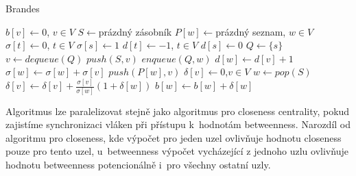 \documentclass{bakalarka}
\begin{document}
\begin{center}
\begin{minipage}{\textwidth}
\begin{algorithm}[H]
	\caption{Brandes}
		\label{alg:brandes}

	\begin{algorithmic}[1]
	\Statex
	\State $b[v] \gets 0$, $v \in V$
		\State $S \gets $prázdný zásobník
		\State $P[w] \gets $prázdný seznam, $w \in V$
		\State $\sigma[t] \gets 0$, $t \in V$
		\State $\sigma[s] \gets 1$
		\State $d[t] \gets -1$, $t \in V$
		\State $d[s] \gets 0$
		\State $Q \gets \{s\}$
			\State $v \gets dequeue(Q)$
			\State $push(S, v)$
					\State $enqueue(Q, w)$
					\State $d[w] \gets d[v] + 1$
				\EndIf
					\State $\sigma[w] \gets \sigma[w] + \sigma[v]$
					\State $push(P[w], v)$
				\EndIf
			\EndFor
		\EndWhile
		\State $\delta[v] \gets 0$,$v \in V$
		 
			\State $w \gets pop(S)$
				\State $\delta[v] \gets \delta[v] + \frac{\sigma[v]}{\sigma[w]}(1 + \delta[w])$
			\EndFor
				\State $b[w] \gets b[w] + \delta[w]$
			\EndIf
		\EndWhile
	\EndFor
	\end{algorithmic}
\end{algorithm}
\end{minipage}
\end{center}
\mbox{}



Algoritmus lze paralelizovat stejně jako algoritmus pro closeness centrality,
pokud zajistíme synchronizaci vláken při přístupu k~hodnotám betweenness.
Narozdíl od algoritmu pro closeness, kde výpočet pro jeden uzel ovlivňuje
hodnotu closeness pouze pro tento uzel, u~betweenness výpočet vycházející z
jednoho uzlu ovlivňuje hodnotu betweenness potencionálně i~pro všechny ostatní
uzly.
\end{document}
